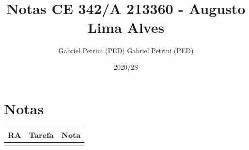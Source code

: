 \documentclass[11pt]{article}
\author{Gabriel Petrini (PED) Gabriel Petrini (PED)}
\date{2020/2S}
\title{Notas CE 342/A 213360 - Augusto Lima Alves}
\begin{document}
\maketitle


\section*{Notas}
\label{sec:org08ce4dc}

\begin{center}
\begin{tabular}{lll}
RA & Tarefa & Nota\\
\hline
 &  & \\
\end{tabular}
\end{center}
\end{document}
